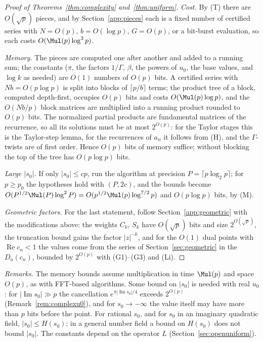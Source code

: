 \begin{small}
\begin{proof}[Proof of Theorems~\ref{thm:complexity} and~\ref{thm:uniform}]
\emph{Cost.} By (T) there are $O(\sqrt p)$ pieces, and by Section~\ref{app:pieces} each is a fixed number of certified
series with $N = O(p)$, $b = O(\log p)$, $G = O(p)$, or a bit-burst evaluation, so each costs $O(\Mul(p)\log^2p)$.

\emph{Memory.} The pieces are computed one after another and added to a running sum; the constants ($\pi$, the factors
$1/\Gamma$, $\beta$, the powers of $u_0$, the base values, and $\log k$ as needed) are $O(1)$ numbers of $O(p)$ bits.
A certified series with $Nb = O(p\log p)$ is split into blocks of $\lceil p/b\rceil$ terms; the product tree of a
block, computed depth-first, occupies $O(p)$ bits and costs $O(\Mul(p)\log p)$, and the $O(Nb/p)$ block matrices are
multiplied into a running product rounded to $O(p)$ bits. The normalized partial products are fundamental matrices
of the recurrence, so all its solutions must be at most $2^{O(p)}$: for the Taylor stages this is the Taylor-step
lemma, for the recurrences of $a_n$ it follows from (H), and the $\Gamma$-twists are of first order. Hence $O(p)$ bits
of memory suffice; without blocking the top of the tree has $O(p\log p)$ bits.

\emph{Large $|s_0|$.} If only $|s_0| \le cp$, run the algorithm at precision $P = \lceil p\log_2p\rceil$; for
$p \ge p_0$ the hypotheses hold with $(P, 2c)$, and the bounds become $O(P^{1/2}\Mul(P)\log^2P) =
O(p^{1/2}\Mul(p)\log^{7/2}p)$ and $O(p\log p)$ bits, by (M).

\emph{Geometric factors.} For the last statement, follow Section~\ref{app:geometric} with the modifications above: the
weights $C_k$, $S_k$ have $O(\sqrt p)$ bits and size $2^{O(\sqrt p)}$, the truncation bound gains the factor
$|z|^{-k}$, and for the $O(1)$ dual points with $\operatorname{Re}c_n < 1$ the values come from the series of
Section~\ref{sec:geometric} in the $D_a(c_n)$, bounded by $2^{O(p)}$ with (G1)--(G3) and (Li).
\end{proof}

\emph{Remarks.} The memory bounds assume multiplication in time $\Mul(p)$ and space $O(p)$, as with FFT-based
algorithms. Some bound on $|s_0|$ is needed with real $u_0$: for $|\operatorname{Im}s_0| \gg p$ the cancellation
$e^{\pi|\operatorname{Im}s_0|/4}$ exceeds $2^{O(p)}$ (Remark~\ref{rem:complexu0}), and for $s_0 \to -\infty$ the value
itself may have more than $p$ bits before the point. For rational $s_0$, and for $s_0$ in an imaginary quadratic
field, $|s_0| \le H(s_0)$; in a general number field a bound on $H(s_0)$ does not bound $|s_0|$. The constants depend
on the operator $L$ (Section~\ref{sec:openuniform}).


\end{small}
